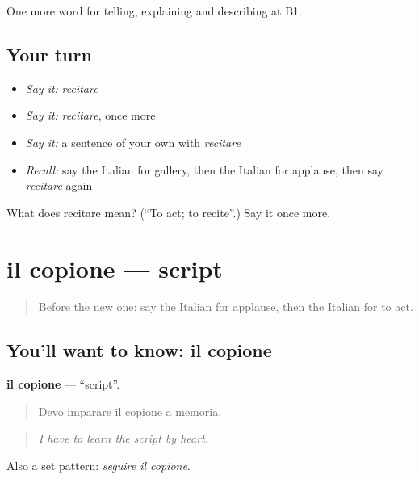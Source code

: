 \begin{grammarlens}[title={What you've built}]
One more word for telling, explaining and describing at B1.
\end{grammarlens}

\subsection*{Your turn}
\begin{itemize}
\raggedright
  \item \emph{Say it:} \emph{recitare}
  \item \emph{Say it:} \emph{recitare}, once more
  \item \emph{Say it:} a sentence of your own with \emph{recitare}
  \item \emph{Recall:} say the Italian for gallery, then the Italian for applause, then say \emph{recitare} again
\end{itemize}

\begin{tcolorbox}[breakable,colback=teal!4,colframe=teal!35!black,title={Before you move on}]
What does recitare mean? (\textquotedblleft{}To act; to recite\textquotedblright{}.) Say it once more.
\end{tcolorbox}
\section[il copione]{il copione — script}

\label{lesson:IT-C520-copione}



\begin{quote}
Before the new one: say the Italian for applause, then the Italian for to act.
\end{quote}

\subsection*{You'll want to know: il copione}
\textbf{il copione} — \textquotedblleft{}script\textquotedblright{}.

\begin{quote}
Devo imparare il copione a memoria.
\end{quote}

\begin{quote}
\emph{I have to learn the script by heart.}
\end{quote}

Also a set pattern: \emph{seguire il copione}.

